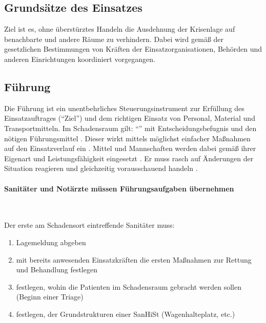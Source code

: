 \subsection{Grundsätze des Einsatzes}
\label{topic:einsatzgrundsaetze}


Ziel ist es, ohne überstürztes Handeln die Ausdehnung der
Krisenlage auf benachbarte und andere Räume zu verhindern.
Dabei wird gemäß der gesetzlichen Bestimmungen von Kräften
der Einsatzorganisationen, Behörden und anderen
Einrichtungen koordiniert vorgegangen.

\subsection{Führung}
\label{topic:katastrophe-fuehrung}

Die Führung ist ein unentbehrliches Steuerungsinstrument zur
Erfüllung des Einsatzauftrages
(\enquote{Ziel}) und dem richtigen
Einsatz von Personal, Material und Transportmitteln. Im Schadensraum gilt:
\enquote{} mit
Entscheidungsbefugnis und den nötigen Führungsmittel
.
Dieser wirkt mittels möglichst einfacher Ma{\ss}nahmen
 auf den
Einsatzverlauf ein
.
Mittel und Mannschaften werden dabei gemäß ihrer Eigenart
und Leistungsfähigkeit eingesetzt
.
Er muss rasch auf Änderungen der Situation reagieren
 und
gleichzeitig vorausschauend handeln
.


\paragraph{Sanitäter und Notärzte müssen Führungsaufgaben
übernehmen}~

Der erste am Schadensort eintreffende Sanitäter muss:

\begin{enumerate}
    \item Lagemeldung abgeben
    \item mit bereits anwesenden Einsatzkräften die ersten
    Maßnahmen zur Rettung und Behandlung festlegen
    \item festlegen, wohin die Patienten im Schadensraum
    gebracht werden sollen (Beginn einer Triage)
    \item festlegen, der Grundstrukturen einer SanHiSt (Wagenhalteplatz, etc.)
\end{enumerate}

